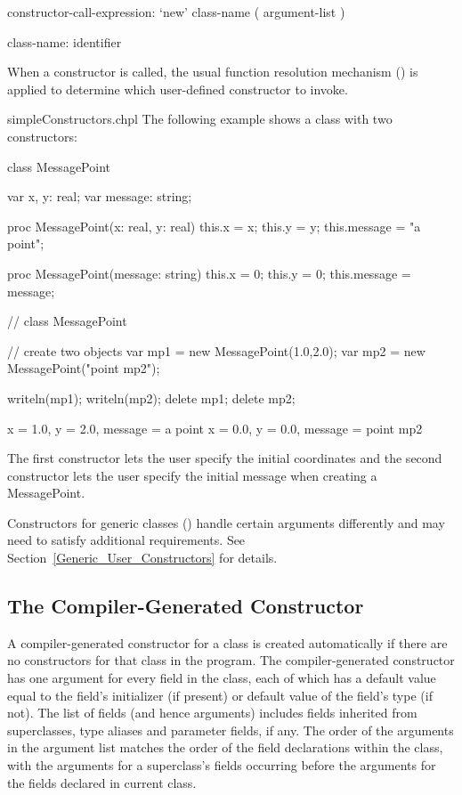 \begin{syntax}
constructor-call-expression:
  `new' class-name ( argument-list )

class-name:
  identifier
\end{syntax}

When a constructor is called, the usual function resolution mechanism
() is applied to determine which
user-defined constructor to invoke.

\begin{chapelexample}{simpleConstructors.chpl}
The following example shows a class with two constructors:
\begin{chapel}
class MessagePoint {
  var x, y: real;
  var message: string;

  proc MessagePoint(x: real, y: real) {
    this.x = x;
    this.y = y;
    this.message = "a point";
  }

  proc MessagePoint(message: string) {
    this.x = 0;
    this.y = 0;
    this.message = message;
  }
}  // class MessagePoint

// create two objects
var mp1 = new MessagePoint(1.0,2.0);
var mp2 = new MessagePoint("point mp2");
\end{chapel}
\begin{chapelpost}
writeln(mp1);
writeln(mp2);
delete mp1;
delete mp2;
\end{chapelpost}
\begin{chapeloutput}
{x = 1.0, y = 2.0, message = a point}
{x = 0.0, y = 0.0, message = point mp2}
\end{chapeloutput}
The first constructor lets the user specify the initial coordinates
and the second constructor lets the user specify the initial message
when creating a MessagePoint.
\end{chapelexample}

Constructors for generic classes () handle certain
arguments differently and may need to satisfy additional
requirements. See Section~\ref{Generic_User_Constructors} for details.

\subsection{The Compiler-Generated Constructor}
\label{The_Compiler_Generated_Constructor}

A compiler-generated constructor for a class is created automatically
if there are no constructors for that class in the program.
The compiler-generated constructor has one argument for every field in the class,
each of which has a default value equal to the field's initializer (if present) or default value of the field's type (if not).
The list of fields (and hence arguments) includes fields inherited from superclasses, type aliases
and parameter fields, if any.
The order of the arguments in the argument list matches the order of the field declarations
within the class, with the arguments for a superclass's fields occurring
before the arguments for the fields declared in current class.

